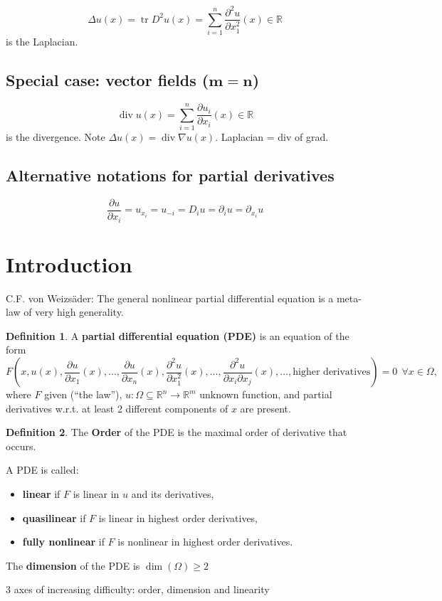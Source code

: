 \documentclass[12pt]{article}
\DeclareMathOperator{\tr}{tr}
\DeclareMathOperator{\diver}{div}
\theoremstyle{definition}
\newtheorem*{definition*}{Definition}
\begin{document}
\[\Delta u(x)=\tr D^2u(x)=\sum_{i=1}^n\frac{\partial^2u}{\partial x_1^2}(x)\in\mathbb{R}\]
is the Laplacian.

\subsection*{Special case: vector fields ($\boldsymbol{m=n}$)}
\[\diver u(x)=\sum_{i=1}^n\frac{\partial u_i}{\partial x_i}(x)\in\mathbb{R}\]
is the divergence. Note $\Delta u(x)=\diver\nabla u(x)$. Laplacian = div of grad.

\subsection*{Alternative notations for partial derivatives}
\[\frac{\partial u}{\partial x_i}=u_{x_i}=u_{-i}=D_iu=\partial_iu=\partial_{x_i}u\]

\renewcommand{\thesection}{\Roman{section}}
\section{Introduction}
C.F. von Weizs\"{a}der: The general nonlinear partial differential equation is a meta-law of very high generality.

\begin{definition*}
A \textbf{partial differential equation (PDE)} is an equation of the form
\[F\left(x,u(x),\frac{\partial u}{\partial x_1}(x),\ldots,\frac{\partial u}{\partial x_n}(x),\frac{\partial^2u}{\partial x_1^2}(x),\ldots,\frac{\partial^2u}{\partial x_i\partial x_j}(x),\ldots,\text{higher derivatives}\right)=0\ \ \forall x\in\Omega,\]
where $F$ given (``the law''), $u:\Omega\subseteq\mathbb{R}^n\rightarrow\mathbb{R}^m$ unknown function, and partial derivatives w.r.t. at least 2 different components of $x$ are present.
\end{definition*}

\begin{definition*}
The \textbf{Order} of the PDE is the maximal order of derivative that occurs.

A PDE is called:
\begin{itemize}
\item \textbf{linear} if $F$ is linear in $u$ and its derivatives,
\item \textbf{quasilinear} if $F$ is linear in highest order derivatives,
\item \textbf{fully nonlinear} if $F$ is nonlinear in highest order derivatives.
\end{itemize}

The \textbf{dimension} of the PDE is $\dim(\Omega)\geq2$
\end{definition*}
3 axes of increasing difficulty: order, dimension and linearity
\end{document}
